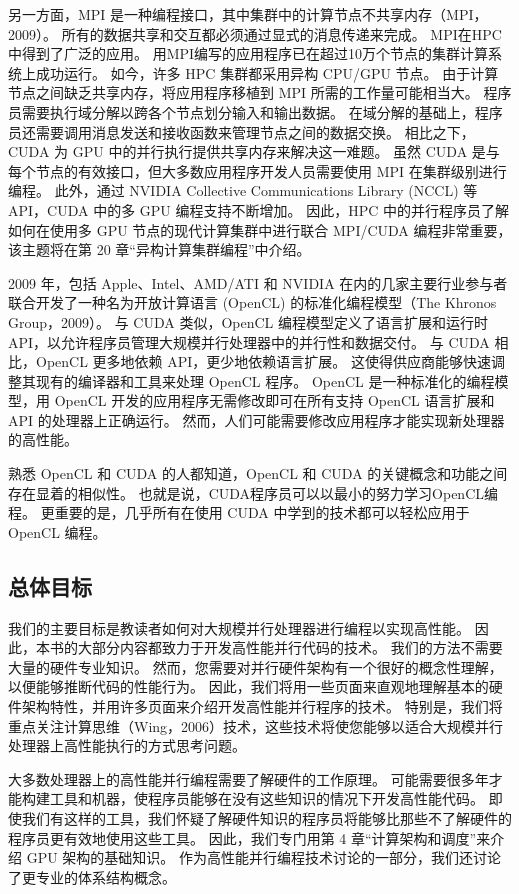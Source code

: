 另一方面，MPI 是一种编程接口，其中集群中的计算节点不共享内存（MPI，2009）。 所有的数据共享和交互都必须通过显式的消息传递来完成。 MPI在HPC中得到了广泛的应用。 用MPI编写的应用程序已在超过10万个节点的集群计算系统上成功运行。 如今，许多 HPC 集群都采用异构 CPU/GPU 节点。 由于计算节点之间缺乏共享内存，将应用程序移植到 MPI 所需的工作量可能相当大。 程序员需要执行域分解以跨各个节点划分输入和输出数据。 在域分解的基础上，程序员还需要调用消息发送和接收函数来管理节点之间的数据交换。 相比之下，CUDA 为 GPU 中的并行执行提供共享内存来解决这一难题。 虽然 CUDA 是与每个节点的有效接口，但大多数应用程序开发人员需要使用 MPI 在集群级别进行编程。 此外，通过 NVIDIA Collective Communications Library (NCCL) 等 API，CUDA 中的多 GPU 编程支持不断增加。 因此，HPC 中的并行程序员了解如何在使用多 GPU 节点的现代计算集群中进行联合 MPI/CUDA 编程非常重要，该主题将在第 20 章“异构计算集群编程”中介绍。

2009 年，包括 Apple、Intel、AMD/ATI 和 NVIDIA 在内的几家主要行业参与者联合开发了一种名为开放计算语言 (OpenCL) 的标准化编程模型（The Khronos Group，2009）。 与 CUDA 类似，OpenCL 编程模型定义了语言扩展和运行时 API，以允许程序员管理大规模并行处理器中的并行性和数据交付。 与 CUDA 相比，OpenCL 更多地依赖 API，更少地依赖语言扩展。 这使得供应商能够快速调整其现有的编译器和工具来处理 OpenCL 程序。 OpenCL 是一种标准化的编程模型，用 OpenCL 开发的应用程序无需修改即可在所有支持 OpenCL 语言扩展和 API 的处理器上正确运行。 然而，人们可能需要修改应用程序才能实现新处理器的高性能。

熟悉 OpenCL 和 CUDA 的人都知道，OpenCL 和 CUDA 的关键概念和功能之间存在显着的相似性。 也就是说，CUDA程序员可以以最小的努力学习OpenCL编程。 更重要的是，几乎所有在使用 CUDA 中学到的技术都可以轻松应用于 OpenCL 编程。

\subsection{总体目标}
我们的主要目标是教读者如何对大规模并行处理器进行编程以实现高性能。 因此，本书的大部分内容都致力于开发高性能并行代码的技术。 我们的方法不需要大量的硬件专业知识。 然而，您需要对并行硬件架构有一个很好的概念性理解，以便能够推断代码的性能行为。 因此，我们将用一些页面来直观地理解基本的硬件架构特性，并用许多页面来介绍开发高性能并行程序的技术。 特别是，我们将重点关注计算思维（Wing，2006）技术，这些技术将使您能够以适合大规模并行处理器上高性能执行的方式思考问题。

大多数处理器上的高性能并行编程需要了解硬件的工作原理。 可能需要很多年才能构建工具和机器，使程序员能够在没有这些知识的情况下开发高性能代码。 即使我们有这样的工具，我们怀疑了解硬件知识的程序员将能够比那些不了解硬件的程序员更有效地使用这些工具。 因此，我们专门用第 4 章“计算架构和调度”来介绍 GPU 架构的基础知识。 作为高性能并行编程技术讨论的一部分，我们还讨论了更专业的体系结构概念。

